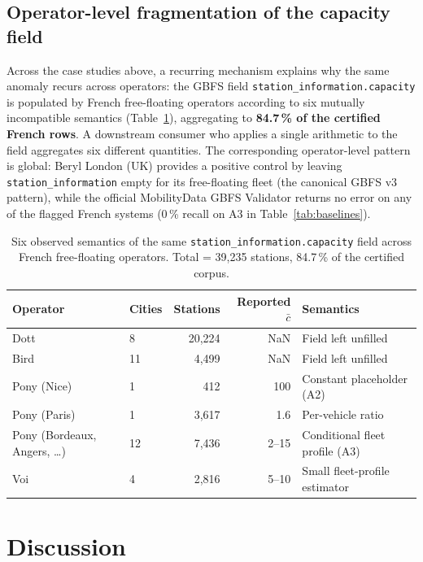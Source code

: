 \documentclass[11pt,a4paper]{article}
\begin{document}
\subsection{Operator-level fragmentation of the capacity field}
Across the case studies above, a recurring mechanism explains why
the same anomaly recurs across operators: the GBFS field
\texttt{station\_information.capacity} is populated by French
free-floating operators according to six mutually incompatible
semantics (Table~\ref{tab:capacity-semantics}), aggregating to
\textbf{84.7\,\% of the certified French rows}. A downstream
consumer who applies a single arithmetic to the field aggregates
six different quantities. The corresponding operator-level pattern
is global: Beryl London (UK) provides a positive control by leaving
\texttt{station\_information} empty for its free-floating fleet
(the canonical GBFS v3 pattern), while the official MobilityData
GBFS Validator \cite{MobilityData2024Validator} returns no error
on any of the flagged French systems (0\,\% recall on A3 in
Table~\ref{tab:baselines}).

\begin{table}[ht]
\centering
\caption{Six observed semantics of the same
\texttt{station\_information.capacity} field across French
free-floating operators. Total = 39{,}235 stations, 84.7\,\% of the
certified corpus.}
\label{tab:capacity-semantics}
\small
\begin{tabular}{@{}llrrl@{}}
\toprule
\textbf{Operator} & \textbf{Cities} & \textbf{Stations} & \textbf{Reported $\bar c$} & \textbf{Semantics}\\
\midrule
Dott         & 8  & 20{,}224 & NaN  & Field left unfilled \\
Bird         & 11 &  4{,}499 & NaN  & Field left unfilled \\
Pony (Nice)  & 1  &     412  & 100  & Constant placeholder (A2) \\
Pony (Paris) & 1  &  3{,}617 & 1.6  & Per-vehicle ratio \\
Pony (Bordeaux, Angers, \dots) & 12 &  7{,}436 & 2--15 & Conditional fleet profile (A3) \\
Voi          & 4  &  2{,}816 & 5--10 & Small fleet-profile estimator \\
\bottomrule
\end{tabular}
\end{table}

\section{Discussion}\label{secDiscussion}
\end{document}
